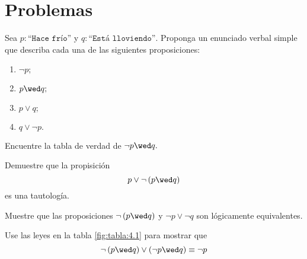 \section*{Problemas}



\begin{problema}
	Sea $p:\texttt{``Hace frío''}$ y $q:\texttt{``Está lloviendo''.}$ Proponga un enunciado verbal simple que describa cada una de las siguientes proposiciones:
	\begin{enumerate}
		\item $\neg p;$
		\item $p \wed q;$
		\item $p \vee q;$
		\item $q \vee \neg p.$
	\end{enumerate}
	
\end{problema}




\begin{problema}
	Encuentre la tabla de verdad de $\neg p \wed q.$
\end{problema}




\begin{problema}
	Demuestre que la propisición 
	$$
	p \vee \neg \left( p\wed q \right)
	$$ es una tautología.
\end{problema}




\begin{problema}
	Muestre que las proposiciones $\neg\left( p \wed q \right)$ y $\neg p \vee \neg q$ son lógicamente equivalentes.
\end{problema}




\begin{problema}
	Use las leyes en la tabla \ref{fig:tabla:4.1} para mostrar que 
	$$
	\neg \left( p \wed q \right) \vee \left( \neg p \wed  q \right) \equiv \neg p
	$$
\end{problema}





